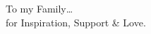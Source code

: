 
%
%
%

\begin{dedicationQ}

To my Family\ldots\\ \hspace{0.75cm}for Inspiration, Support \& Love.
\end{dedicationQ}





